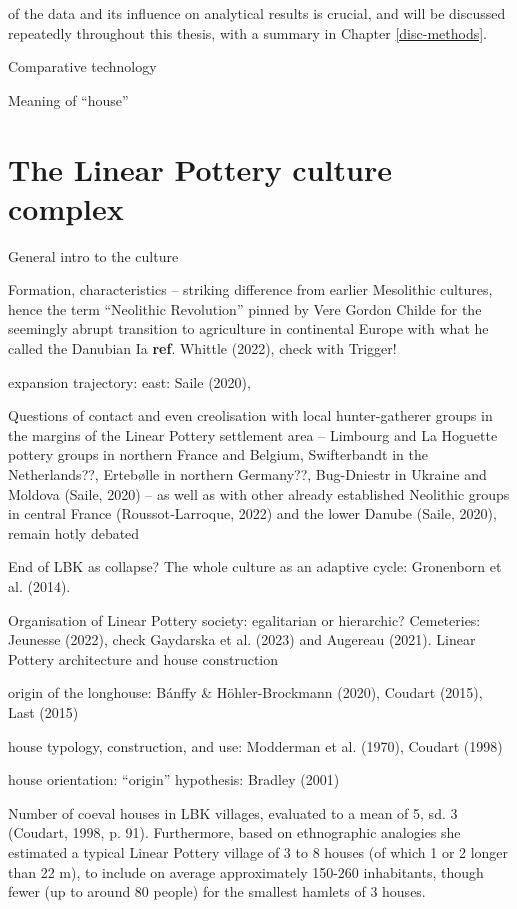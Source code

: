 \documentclass[
  12pt,
]{book}
\begin{document}
of the data and its influence on analytical results is crucial, and will be discussed repeatedly throughout this thesis, with a summary in Chapter \ref{disc-methods}.

Comparative technology

Meaning of ``house''

\hypertarget{lbk}{%
\section{The Linear Pottery culture complex}\label{lbk}}

General intro to the culture

Formation, characteristics -- striking difference from earlier Mesolithic cultures, hence the term ``Neolithic Revolution'' pinned by Vere Gordon Childe for the seemingly abrupt transition to agriculture in continental Europe with what he called the Danubian Ia \textbf{ref}. Whittle (2022), check with Trigger!

expansion trajectory: east: Saile (2020),

Questions of contact and even creolisation with local hunter-gatherer groups in the margins of the Linear Pottery settlement area -- Limbourg and La Hoguette pottery groups in northern France and Belgium, Swifterbandt in the Netherlands??, Ertebølle in northern Germany??, Bug-Dniestr in Ukraine and Moldova (Saile, 2020) -- as well as with other already established Neolithic groups in central France (Roussot‑Larroque, 2022) and the lower Danube (Saile, 2020), remain hotly debated

End of LBK as collapse? The whole culture as an adaptive cycle: Gronenborn et al. (2014).

Organisation of Linear Pottery society: egalitarian or hierarchic? Cemeteries: Jeunesse (2022), check Gaydarska et al. (2023) and Augereau (2021). Linear Pottery architecture and house construction

origin of the longhouse: Bánffy \& Höhler-Brockmann (2020), Coudart (2015), Last (2015)

house typology, construction, and use: Modderman et al. (1970), Coudart (1998)

house orientation: ``origin'' hypothesis: Bradley (2001)

Number of coeval houses in LBK villages, evaluated to a mean of 5, sd. 3 (Coudart, 1998, p. 91). Furthermore, based on ethnographic analogies she estimated a typical Linear Pottery village of 3 to 8 houses (of which 1 or 2 longer than 22 m), to include on average approximately 150-260 inhabitants, though fewer (up to around 80 people) for the smallest hamlets of 3 houses.
\end{document}
